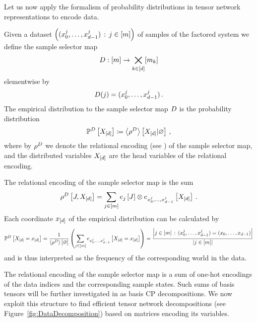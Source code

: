 \label{sec:empDistribution}

Let us now apply the formalism of probability distributions in tensor network representations to encode data.
\begin{definition}\label{def:dataMap}
	Given a dataset $\left(({x_{0}^{j},\ldots,x_{d-1}^{j}})\,:\,j\in[m]\right)$ of samples of the factored system we define the sample selector map
		\[ D : [m] \rightarrow \bigtimes_{k\in[d]}[m_{k}] \]
	elementwise by 
		\[ D(j) = ({x_{0}^{j},\ldots,x_{d-1}^{j}}) \, . \]
	The empirical distribution to the sample selector map $D$ is the probability distribution
	\begin{align*}
		\mathbb{P}^{D}\left[X_{[d]}\right]
		\coloneqq \left\langle \rho^{D}\right\rangle \left[ X_{[d]} | \varnothing \right] \, ,
	\end{align*}
	where by $\rho^{D}$ we denote the relational encoding (see ) of the sample selector map, and the distributed variables $X_{[d]}$ are the head variables of the relational encoding.
\end{definition}

The relational encoding of the sample selector map is the sum 
	\[ \rho^{D}\left[J,X_{[d]}\right] 
	= \sum_{j\in[m]} e_{j}\left[J\right] \otimes e_{{x_{0}^{j},\ldots,x_{d-1}^{j}}}\left[X_{[d]}\right] \, . \]
Each coordinate $x_{[d]}$ of the empirical distribution can be calculated by
\begin{align*}
	\mathbb{P}^{D}\left[X_{[d]}=x_{[d]}\right] 
	= \frac{1}{\left\langle \rho^{D}\right\rangle \left[ \varnothing \right]} \left( \sum_{j\in[m]} e_{{x_{0}^{j},\ldots,x_{d-1}^{j}}}\left[X_{[d]}=x_{[d]}\right]  \right)
	= \frac{\left|j\in[m] \, : \, ({x_{0}^{j},\ldots,x_{d-1}^{j}}) = (x_{0},\ldots,x_{d-1})\right|}{\left|j\in[m]\right|}
\end{align*}
and is thus interpreted as the frequency of the corresponding world in the data.

The relational encoding of the sample selector map is a sum of one-hot encodings of the data indices and the corresponding sample states.
Such sums of basis tensors will be further investigated in  as basis CP decompositions.
We now exploit this structure to find efficient tensor network decompositions (see Figure~\ref{fig:DataDecomposition}) based on matrices encoding its variables.


